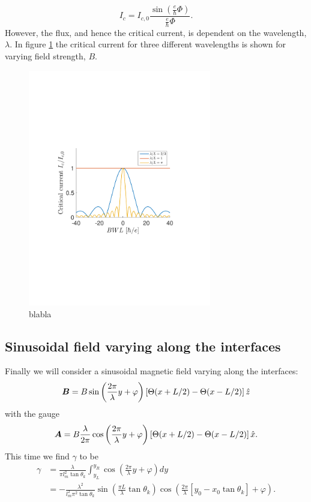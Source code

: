 \begin{equation}
    I_c = I_{c,0}\frac{\sin(\frac{e}{\hbar}\Phi)}{\frac{e}{\hbar}\Phi}.
\end{equation}
However, the flux, and hence the critical current, is dependent on the wavelength, $\lambda$. In figure \ref{fig:critical_phi_pi-2} the critical current for three different wavelengths is shown for varying field strength, $B$. 
\begin{figure}[hhh]
\centering
\includegraphics[width=8cm,clip=true,trim=3cm 8cm 4cm 9cm]{fig/critical_phi_pi-2}
\caption{blabla}
\label{fig:critical_phi_pi-2}
\end{figure}

\subsection{Sinusoidal field varying along the interfaces}
Finally we will consider a sinusoidal magnetic field varying along the interfaces:
\begin{equation}
    \boldsymbol{B} = B\sin\left(\frac{2\pi}{\lambda}y + \varphi\right)\left[\Theta(x+L/2) - \Theta(x-L/2) \right]\hat{z}
\label{Binterface}
\end{equation}
with the gauge
\begin{equation}
    \boldsymbol{A} = B\frac{\lambda}{2\pi}\cos\left(\frac{2\pi}{\lambda}y+\varphi\right)\left[\Theta(x+L/2) - \Theta(x-L/2) \right]\hat{x}.
\end{equation}
This time we find $\gamma$ to be
\begin{equation}
\begin{split}
    \gamma &= 
    \frac{\lambda}{\pi l_m^2 \tan\theta_k}\int_{y_L}^{y_R} \cos\left(\frac{2\pi}{\lambda}y + \varphi \right) dy
    \\
    &= -\frac{\lambda^2}{l_m^2\pi^2\tan\theta_k}\sin\left(\frac{\pi L}{\lambda}\tan\theta_k\right)\cos\left(\frac{2\pi}{\lambda}\left[y_0-x_0\tan\theta_k\right] + \varphi\right).
\end{split}
\end{equation}

